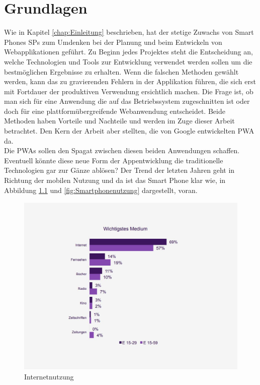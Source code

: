 \chapter{Grundlagen}
\thispagestyle{standard}
\pagestyle{standard}
\renewcommand{\footrulewidth}{0.4pt}

Wie in Kapitel \ref{chap:Einleitung} beschrieben, hat der stetige Zuwachs von Smart Phones \acs{SP}s \cite{Geraetenutzung} zum Umdenken bei der Planung und beim Entwickeln von Webapplikationen geführt.
Zu Beginn jedes Projektes steht die Entscheidung an, welche Technologien und Tools zur Entwicklung verwendet werden sollen um die bestmöglichen Ergebnisse zu erhalten.
Wenn die falschen Methoden gewählt werden, kann das zu gravierenden Fehlern in der Applikation führen, die sich erst mit Fortdauer der produktiven Verwendung ersichtlich machen. 
Die Frage ist, ob man sich für eine Anwendung die auf das Betriebssystem zugeschnitten ist oder doch für eine plattformübergreifende Webanwendung entscheidet. Beide Methoden haben Vorteile und Nachteile und werden im Zuge dieser Arbeit betrachtet. Den Kern der Arbeit aber stellten, die von Google entwickelten \acs{PWA} \cite{PWA} da. \\Die \acs{PWA}s sollen den Spagat zwischen diesen beiden Anwendungen schaffen. Eventuell könnte diese neue Form der Appentwicklung die traditionelle Technologien gar zur Gänze ablösen?
Der Trend der letzten Jahren geht in Richtung der mobilen Nutzung und da ist das Smart Phone klar wie, in Abbildung \ref{fig:Internetnutzung} und \ref{fig:Smartphonenutzung} dargestellt, voran.  

\begin{figure}[h]
	\centering
	\includegraphics[width=12cm]{BilderAllgemein/Internetnutzung}\medskip
	\caption{Internetnutzung \cite{Geraetenutzung}}
	\label{fig:Internetnutzung}
\end{figure}

